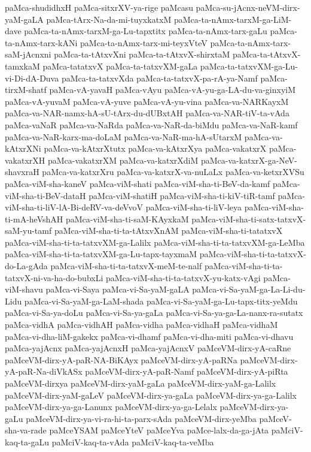 {paMca-shudidhxH
paMca-sitxrXV-ya-rige
paMcasu
paMca-su-jAcnx-neVM-dirx-yaM-gaLA
paMca-tArx-Na-da-mi-tuyxkatxM
paMca-ta-nAmx-tarxM-ga-LiM-dave
paMca-ta-nAmx-tarxM-ga-Lu-tapxtitx
paMca-ta-nAmx-tarx-gaLu
paMca-ta-nAmx-tarx-kANi
paMca-ta-nAmx-tarx-mi-teyxVteV
paMca-ta-nAmx-tarx-saM-jAcnxni
paMca-ta-tAtxvXni
paMca-ta-tAtxvX-shirxtaM
paMca-ta-tAtxvX-tamxkaM
paMca-tatatxvX
paMca-ta-tatxvXM-gaLa
paMca-ta-tatxvXM-ga-Lu-vi-Di-dA-Duva
paMca-ta-tatxvXda
paMca-ta-tatxvX-pa-rA-ya-Namf
paMca-tirxM-shatf
paMca-vA-yavaH
paMca-vAyu
paMca-vA-yu-ga-LA-du-va-ginxyiM
paMca-vA-yuvaM
paMca-vA-yuve
paMca-vA-yu-vina
paMca-va-NARKayxM
paMca-va-NAR-namx-hA-sU-tArx-du-dUBxtAH
paMca-va-NAR-tiV-ta-vAda
paMca-vaNaR
paMca-va-NaRda
paMca-va-NaR-da-biMdu
paMca-va-NaR-kamf
paMca-va-NaR-karx-ma-doLaM
paMca-va-NaR-ma-hA-sUtarxM
paMca-va-kAtxrXNi
paMca-va-kAtxrXtutx
paMca-va-kAtxrXya
paMca-vakatxrX
paMca-vakatxrXH
paMca-vakatxrXM
paMca-va-katxrXdiM
paMca-va-katxrX-ga-NeV-shavxraH
paMca-va-katxrXru
paMca-va-katxrX-va-nuLaLx
paMca-va-ketxrXVSu
paMca-viM-sha-kaneV
paMca-viM-shati
paMca-viM-sha-ti-BeV-da-kamf
paMca-viM-sha-ti-BeV-dataH
paMca-viM-shatiH
paMca-viM-sha-ti-kiV-tiR-tamf
paMca-viM-sha-ti-liV-lA-Bi-deRV-va-deVvoV
paMca-viM-sha-ti-liV-leya
paMca-viM-sha-ti-mA-heVshAH
paMca-viM-sha-ti-saM-KAyxkaM
paMca-viM-sha-ti-satx-tatxvX-saM-yu-tamf
paMca-viM-sha-ti-ta-tAtxvXnAM
paMca-viM-sha-ti-tatatxvX
paMca-viM-sha-ti-ta-tatxvXM-ga-Lalilx
paMca-viM-sha-ti-ta-tatxvXM-ga-LeMba
paMca-viM-sha-ti-ta-tatxvXM-ga-Lu-tapx-tayxmaM
paMca-viM-sha-ti-ta-tatxvX-do-La-gAda
paMca-viM-sha-ti-ta-tatxvX-meM-te-nalf
paMca-viM-sha-ti-ta-tatxvX-ni-va-ha-do-bubxLi
paMca-viM-sha-ti-ta-tatxvX-yu-katx-vAgi
paMca-viM-shavu
paMca-vi-Saya
paMca-vi-Sa-yaM-gaLA
paMca-vi-Sa-yaM-ga-La-Li-du-Lidu
paMca-vi-Sa-yaM-ga-LaM-shada
paMca-vi-Sa-yaM-ga-Lu-tapx-titx-yeMdu
paMca-vi-Sa-ya-doLu
paMca-vi-Sa-ya-gaLa
paMca-vi-Sa-ya-ga-La-nanx-ra-sutatx
paMca-vidhA
paMca-vidhAH
paMca-vidha
paMca-vidhaH
paMca-vidhaM
paMca-vi-dha-liM-gakekx
paMca-vi-dhamf
paMca-vi-dha-miti
paMca-vi-dhavu
paMca-yajAcnx
paMca-yajAcnxH
paMca-yajAcnxV
paMceVM-dirx-yA-caRne
paMceVM-dirx-yA-paR-NA-BiKAyx
paMceVM-dirx-yA-paRNa
paMceVM-dirx-yA-paR-Na-diVkASx
paMceVM-dirx-yA-paR-Namf
paMceVM-dirx-yA-piRta
paMceVM-dirxya
paMceVM-dirx-yaM-gaLa
paMceVM-dirx-yaM-ga-Lalilx
paMceVM-dirx-yaM-gaLeV
paMceVM-dirx-ya-gaLa
paMceVM-dirx-ya-ga-Lalilx
paMceVM-dirx-ya-ga-Lanunx
paMceVM-dirx-ya-ga-Lelalx
paMceVM-dirx-ya-gaLu
paMceVM-dirx-ya-vi-ra-hi-ta-parx-sAda
paMceVM-dirx-yeMba
paMceV-sha-va-rade
paMceYSAM
paMceYteV
paMceYva
paMce-lalx-da-ga-jAta
paMciV-kaq-ta-gaLu
paMciV-kaq-ta-vAda
paMciV-kaq-ta-veMba
}
